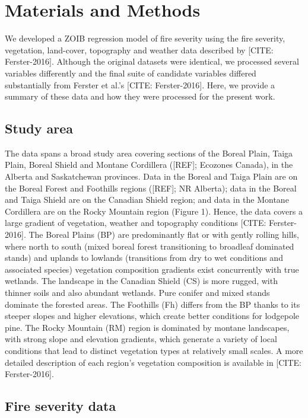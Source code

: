 \documentclass[
  numafflabel,
  authoryear,
  preprint]{elsarticle}
\begin{document}
\section{Materials and Methods}\label{materials-and-methods}

We developed a ZOIB regression model of fire severity using the fire
severity, vegetation, land-cover, topography and weather data described
by {[}CITE: Ferster-2016{]}. Although the original datasets were
identical, we processed several variables differently and the final
suite of candidate variables differed substantially from Ferster et
al.'s {[}CITE: Ferster-2016{]}. Here, we provide a summary of these data
and how they were processed for the present work.

\subsection{Study area}\label{study-area}

The data spans a broad study area covering sections of the Boreal Plain,
Taiga Plain, Boreal Shield and Montane Cordillera ({[}REF{]}; Ecozones
Canada), in the Alberta and Saskatchewan provinces. Data in the Boreal
and Taiga Plain are on the Boreal Forest and Foothills regions
({[}REF{]}; NR Alberta); data in the Boreal and Taiga Shield are on the
Canadian Shield region; and data in the Montane Cordillera are on the
Rocky Mountain region (Figure 1). Hence, the data covers a large
gradient of vegetation, weather and topography conditions {[}CITE:
Ferster-2016{]}. The Boreal Plains (BP) are predominantly flat or with
gently rolling hills, where north to south (mixed boreal forest
transitioning to broadleaf dominated stands) and uplands to lowlands
(transitions from dry to wet conditions and associated species)
vegetation composition gradients exist concurrently with true wetlands.
The landscape in the Canadian Shield (CS) is more rugged, with thinner
soils and also abundant wetlands. Pure conifer and mixed stands dominate
the forested areas. The Foothills (Fh) differs from the BP thanks to its
steeper slopes and higher elevations, which create better conditions for
lodgepole pine. The Rocky Mountain (RM) region is dominated by montane
landscapes, with strong slope and elevation gradients, which generate a
variety of local conditions that lead to distinct vegetation types at
relatively small scales. A more detailed description of each region's
vegetation composition is available in {[}CITE: Ferster-2016{]}.

\subsection{Fire severity data}\label{fire-severity-data}
\end{document}
